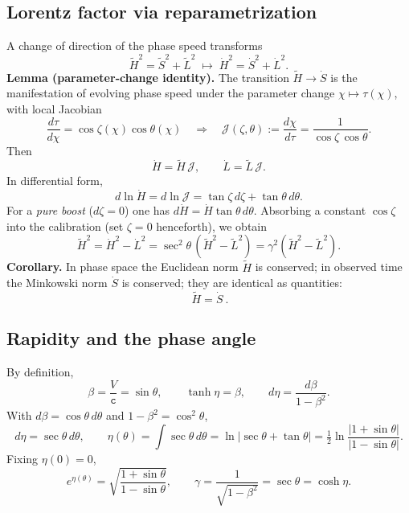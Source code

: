 \documentclass[11pt]{article}
\numberwithin{equation}{section}
\begin{document}
\subsection{Lorentz factor via reparametrization}
A change of direction of the phase speed transforms
\begin{equation}
\tilde{H}^2=\tilde{S}^2+\tilde{L}^2 \;\longmapsto\;
\dot{H}^2=\dot{S}^2+\dot{L}^2.
\label{eq:351}
\end{equation}
\textbf{Lemma (parameter-change identity).} The transition $\tilde{H}\to\dot{S}$ is the manifestation of evolving phase speed under the parameter change $\chi\mapsto \tau(\chi)$, with local Jacobian
\begin{equation}
\frac{d\tau}{d\chi}=\cos\zeta(\chi)\cos\theta(\chi)
\quad\Rightarrow\quad
\mathcal{J}(\zeta,\theta):=\frac{d\chi}{d\tau}=\frac{1}{\cos\zeta\,\cos\theta}.
\label{eq:353}
\end{equation}
Then
\begin{equation}
\dot{H}=\tilde{H}\,\mathcal{J},\qquad \dot{L}=\tilde{L}\,\mathcal{J}.
\label{eq:354}
\end{equation}
In differential form,
\begin{equation}
d\ln\dot{H}=d\ln\mathcal{J}=\tan\zeta\,d\zeta+\tan\theta\,d\theta.
\label{eq:355}
\end{equation}
For a \emph{pure boost} ($d\zeta=0$) one has $d\dot{H}=\dot{H}\tan\theta\,d\theta$. Absorbing a constant $\cos\zeta$ into the calibration (set $\zeta=0$ henceforth), we obtain
\begin{equation}
\tilde{H}^2=\dot{H}^2-\dot{L}^2=\sec^2\theta\,(\tilde{H}^2-\tilde{L}^2)=\gamma^2(\tilde{H}^2-\tilde{L}^2).
\label{eq:356}
\end{equation}
\textbf{Corollary.} In phase space the Euclidean norm $\tilde{H}$ is conserved; in observed time the Minkowski norm $\dot{S}$ is conserved; they are identical as quantities:
\begin{equation}
\boxed{\ \tilde{H}=\dot{S}\ }.
\label{eq:357}
\end{equation}

\subsection{Rapidity and the phase angle}
By definition,
\begin{equation}
\beta=\frac{V}{\mathtt{c}}=\sin\theta,\qquad \tanh\eta=\beta,\qquad
d\eta=\frac{d\beta}{1-\beta^2}.
\label{eq:361}
\end{equation}
With $d\beta=\cos\theta\,d\theta$ and $1-\beta^2=\cos^2\theta$,
\begin{equation}
d\eta=\sec\theta\,d\theta,\qquad
\eta(\theta)=\int\sec\theta\,d\theta
=\ln|\sec\theta+\tan\theta|
=\tfrac12\ln\frac{|1+\sin\theta|}{|1-\sin\theta|}.
\label{eq:364}
\end{equation}
Fixing $\eta(0)=0$,
\begin{equation}
e^{\eta(\theta)}=\sqrt{\frac{1+\sin\theta}{1-\sin\theta}},\qquad
\gamma=\frac{1}{\sqrt{1-\beta^2}}=\sec\theta=\cosh\eta.
\label{eq:365}
\end{equation}
\end{document}
